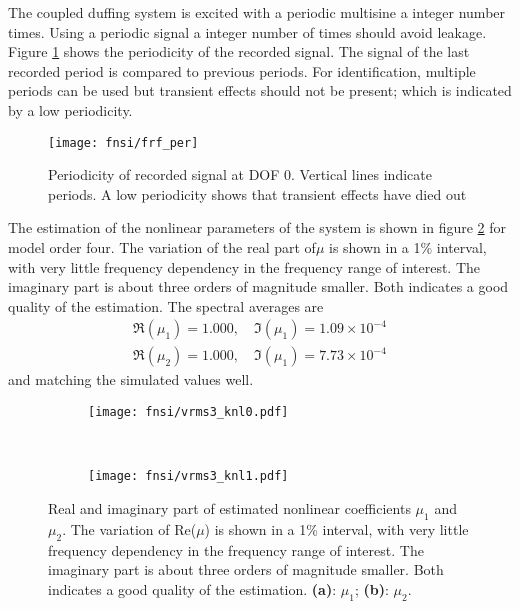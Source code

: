 The coupled duffing system is excited with a periodic multisine a integer
number times. Using a periodic signal a integer number of times should avoid
leakage\autocite{ewins2000a}.
Figure \ref{fig:periodicity} shows the periodicity of the recorded signal. The
signal of the last recorded period is compared to previous periods. For
identification, multiple periods can be used but transient effects should not be
present; which is indicated by a low periodicity.

\begin{figure}[!ht]
  \centering
  \texttt{[image: fnsi/frf\_per]}
  \caption{Periodicity of recorded signal at DOF 0. Vertical lines indicate
    periods. A low periodicity shows that transient effects have died out}
  \label{fig:periodicity}
\end{figure}


The estimation of the nonlinear parameters of the system is shown in figure
\ref{fig:fnsi_knl} for model order four. The variation of the real part of$\mu$
is shown in a 1\% interval, with very little frequency dependency in the
frequency range of interest. The imaginary part is about three orders of
magnitude smaller. Both indicates a good quality of the estimation. The spectral
averages are
\begin{equation}
  \begin{aligned}
    \Re (\mu_1) = 1.000, \quad \Im (\mu_1) = 1.09 \times 10^{-4} \\
    \Re (\mu_2) = 1.000, \quad \Im (\mu_1) = 7.73 \times 10^{-4}
  \end{aligned}
\end{equation}
and matching the simulated values well.

\begin{figure}[!ht]
  \centering
  \begin{subfigure}[b]{0.45\textwidth}
    \texttt{[image: fnsi/vrms3\_knl0.pdf]}
    \caption{}
  \end{subfigure}
  ~
  \begin{subfigure}[b]{0.45\textwidth}
    \texttt{[image: fnsi/vrms3\_knl1.pdf]}
    \caption{}
  \end{subfigure}
  \caption{Real and imaginary part of estimated nonlinear coefficients $\mu_1$
    and $\mu_2$. The variation of Re($\mu$) is shown in a 1\% interval, with
    very little frequency dependency in the frequency range of interest.
    The imaginary part is about three orders of magnitude smaller. Both
    indicates a good quality of the estimation.
    \textbf{(a)}: $\mu_1$;
    \textbf{(b)}: $\mu_2$.
  }
  \label{fig:fnsi_knl}
\end{figure}

